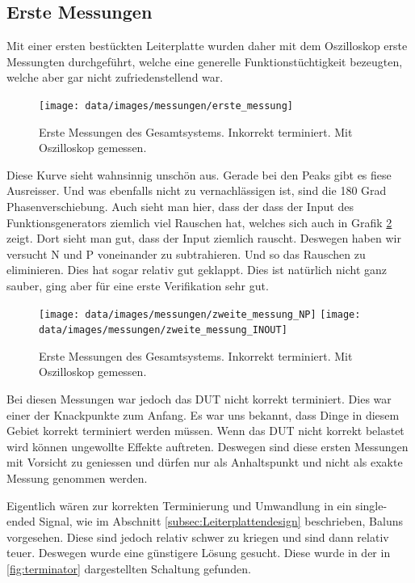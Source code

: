 \subsection{Erste Messungen}

Mit einer ersten bestückten Leiterplatte wurden daher mit dem Oszilloskop erste Messungten durchgeführt, welche eine generelle Funktionstüchtigkeit bezeugten, welche aber gar nicht zufriedenstellend war.

\begin{figure}[H]
\begin{center}
    \texttt{[image: data/images/messungen/erste\_messung]}
    \caption{Erste Messungen des Gesamtsystems. Inkorrekt terminiert. Mit Oszilloskop gemessen.}
    \label{fig:messungen_erste}
\end{center}
\end{figure}

Diese Kurve sieht wahnsinnig unschön aus. Gerade bei den Peaks gibt es fiese Ausreisser. Und was ebenfalls nicht zu vernachlässigen ist, sind die 180 Grad Phasenverschiebung.
Auch sieht man hier, dass der dass der Input des Funktionsgenerators ziemlich viel Rauschen hat, welches sich auch in Grafik \ref{fig:messungen_zweite} zeigt.
Dort sieht man gut, dass der Input ziemlich rauscht. Deswegen haben wir versucht N und P voneinander zu subtrahieren. Und so das Rauschen zu eliminieren. Dies hat sogar relativ gut geklappt. Dies ist natürlich nicht ganz sauber, ging aber für eine erste Verifikation sehr gut.

\begin{figure}[H]
\begin{center}
    \texttt{[image: data/images/messungen/zweite\_messung\_NP]}
    \texttt{[image: data/images/messungen/zweite\_messung\_INOUT]}
    \caption{Erste Messungen des Gesamtsystems. Inkorrekt terminiert. Mit Oszilloskop gemessen.}
    \label{fig:messungen_zweite}
\end{center}
\end{figure}

Bei diesen Messungen war jedoch das DUT nicht korrekt terminiert. Dies war einer der Knackpunkte zum Anfang. Es war uns bekannt, dass Dinge in diesem Gebiet korrekt terminiert werden müssen. Wenn das DUT nicht korrekt belastet wird können ungewollte Effekte auftreten. Deswegen sind diese ersten Messungen mit Vorsicht zu geniessen und dürfen nur als Anhaltspunkt und nicht als exakte Messung genommen werden.

Eigentlich wären zur korrekten Terminierung und Umwandlung in ein single-ended Signal, wie im Abschnitt \ref{subsec:Leiterplattendesign} beschrieben, Baluns vorgesehen. Diese sind jedoch relativ schwer zu kriegen und sind dann relativ teuer. Deswegen wurde eine günstigere Lösung gesucht. Diese wurde in der in \ref{fig:terminator} dargestellten Schaltung gefunden.

